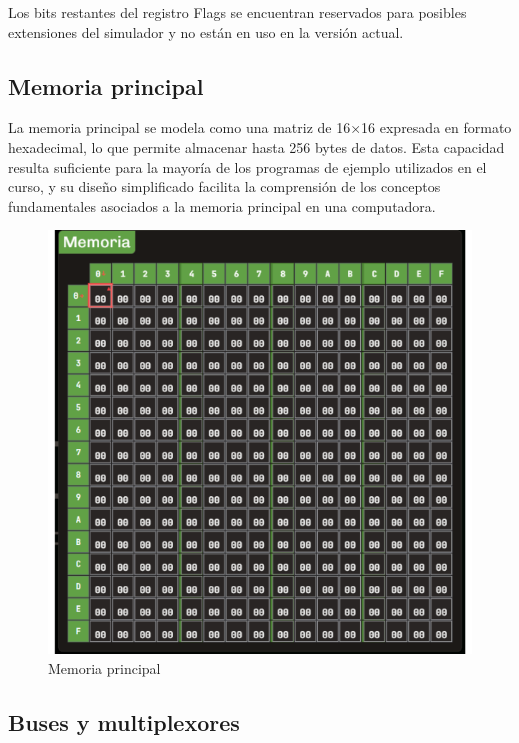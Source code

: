 \documentclass[12pt,oneside]{templates/unerthesis}
\begin{document}
Los bits restantes del registro Flags se encuentran reservados para posibles extensiones del simulador y no están en uso en la versión actual.

\hypertarget{memoria-principal}{%
\subsection{Memoria principal}\label{memoria-principal}}

La memoria principal se modela como una matriz de 16×16 expresada en formato hexadecimal, lo que permite almacenar hasta 256 bytes de datos. Esta capacidad resulta suficiente para la mayoría de los programas de ejemplo utilizados en el curso, y su diseño simplificado facilita la comprensión de los conceptos fundamentales asociados a la memoria principal en una computadora.

\begin{figure}

{\centering \includegraphics[width=1\linewidth]{images/memoria} 

}

\caption{Memoria principal}\label{fig:memoria}
\end{figure}

\hypertarget{buses-y-multiplexores}{%
\subsection{Buses y multiplexores}\label{buses-y-multiplexores}}
\end{document}
